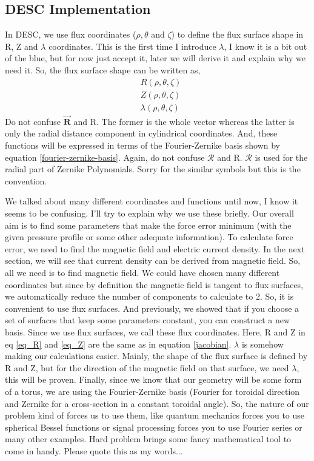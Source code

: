 \subsection{DESC Implementation}

In DESC, we use flux coordinates ($\rho, \theta$ and $\zeta$) to define the flux surface shape in R, Z and $\lambda$ coordinates. This is the first time I introduce $\lambda$, I know it is a bit out of the blue, but for now just accept it, later we will derive it and explain why we need it. So, the flux surface shape can be written as,
\begin{align}
    &R(\rho, \theta, \zeta)  \label{eq_R}\\
    &Z(\rho, \theta, \zeta) \label{eq_Z}\\
    &\lambda(\rho, \theta, \zeta)
\end{align}
{\color{red}Do not confuse $\Vec{\mathbf{R}}$ and R.} The former is the whole vector whereas the latter is only the radial distance component in cylindrical coordinates. And, these functions will be expressed in terms of the Fourier-Zernike basis shown by equation \ref{fourier-zernike-basis}. {\color{red}Again, do not confuse $\mathcal{R}$ and R.} $\mathcal{R}$ is used for the radial part of Zernike Polynomials. Sorry for the similar symbols but this is the convention. 

We talked about many different coordinates and functions until now, I know it seems to be confusing. I'll try to explain why we use these briefly. Our overall aim is to find some parameters that make the force error minimum (with the given pressure profile or some other adequate information). To calculate force error, we need to find the magnetic field and electric current density. In the next section, we will see that current density can be derived from magnetic field. So, all we need is to find magnetic field. We could have chosen many different coordinates but since by definition the magnetic field is tangent to flux surfaces, we automatically reduce the number of components to calculate to 2. So, it is convenient to use flux surfaces. And previously, we showed that if you choose a set of surfaces that keep some parameters constant, you can construct a new basis. Since we use flux surfaces, we call these flux coordinates. Here, R and Z in eq \ref{eq_R} and \ref{eq_Z} are the same as in equation \ref{jacobian}. $\lambda$ is somehow making our calculations easier. Mainly, the shape of the flux surface is defined by R and Z, but for the direction of the magnetic field on that surface, we need $\lambda$, this will be proven. Finally, since we know that our geometry will be some form of a torus, we are using the Fourier-Zernike basis (Fourier for toroidal direction and Zernike for a cross-section in a constant toroidal angle). So, the nature of our problem kind of forces us to use them, like quantum mechanics forces you to use spherical Bessel functions or signal processing forces you to use Fourier series or many other examples. Hard problem brings some fancy mathematical tool to come in handy. Please quote this as my words...

